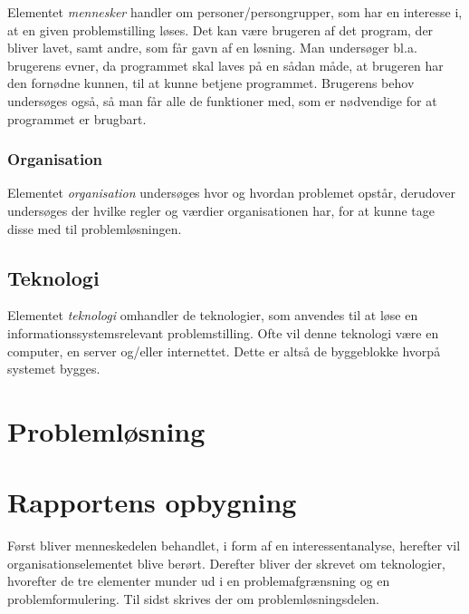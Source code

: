 Elementet \textit{mennesker} handler om personer/persongrupper, som har en interesse i, at en given
problemstilling løses. Det kan være brugeren af det program, der bliver lavet, samt andre, som får gavn af en
løsning. Man undersøger bl.a. brugerens evner, da programmet skal laves på en sådan måde, at brugeren har den
fornødne kunnen, til at kunne betjene programmet. Brugerens behov undersøges også, så man får alle de
funktioner med, som er nødvendige for at programmet er brugbart.


\subsubsection{Organisation}\label{subsec:organisation}

Elementet \textit{organisation} undersøges hvor og hvordan problemet opstår, derudover undersøges der hvilke
regler og værdier organisationen har, for at kunne tage disse med til problemløsningen.


\subsection{Teknologi}\label{subsec:Teknologi}

Elementet \textit{teknologi} omhandler de teknologier, som anvendes til at løse en informationssystemsrelevant
problemstilling. Ofte vil denne teknologi være en computer,
en server og/eller internettet. Dette er altså de byggeblokke hvorpå systemet bygges.

\section{Problemløsning}

\section{Rapportens opbygning}\label{sec:rapportens-opbygning}

Først bliver menneskedelen behandlet, i form af en interessentanalyse, herefter vil organisationselementet
blive berørt. Derefter bliver der skrevet om teknologier, hvorefter de tre elementer munder ud i en
problemafgrænsning og en problemformulering. 
Til sidst skrives der om problemløsningsdelen. 


